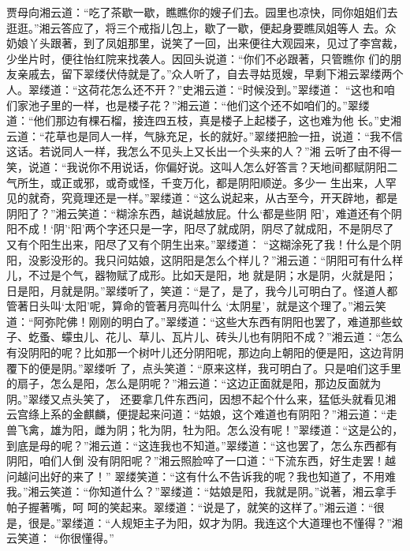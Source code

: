 \begin{parag}
    贾母向湘云道：“吃了茶歇一歇，瞧瞧你的嫂子们去。园里也凉快，同你姐姐们去逛逛。”湘云答应了，将三个戒指儿包上，歇了一歇，便起身要瞧凤姐等人 去。众奶娘丫头跟著，到了凤姐那里，说笑了一回，出来便往大观园来，见过了李宫裁，少坐片时，便往怡红院来找袭人。因回头说道：“你们不必跟著，只管瞧你 们的朋友亲戚去，留下翠缕伏侍就是了。”众人听了，自去寻姑觅嫂，早剩下湘云翠缕两个人。翠缕道：“这荷花怎么还不开？”史湘云道：“时候没到。”翠缕道： “这也和咱们家池子里的一样，也是楼子花？”湘云道：“他们这个还不如咱们的。”翠缕道：“他们那边有棵石榴，接连四五枝，真是楼子上起楼子，这也难为他 长。”史湘云道：“花草也是同人一样，气脉充足，长的就好。”翠缕把脸一扭，说道：“我不信这话。若说同人一样，我怎么不见头上又长出一个头来的人？”湘 云听了由不得一笑，说道：“我说你不用说话，你偏好说。这叫人怎么好答言？天地间都赋阴阳二气所生，或正或邪，或奇或怪，千变万化，都是阴阳顺逆。多少一 生出来，人罕见的就奇，究竟理还是一样。”翠缕道：“这么说起来，从古至今，开天辟地，都是阴阳了？”湘云笑道：“糊涂东西，越说越放屁。什么‘都是些阴 阳’，难道还有个阴阳不成！‘阴’‘阳’两个字还只是一字，阳尽了就成阴，阴尽了就成阳，不是阴尽了又有个阳生出来，阳尽了又有个阴生出来。”翠缕道： “这糊涂死了我！什么是个阴阳，没影没形的。我只问姑娘，这阴阳是怎么个样儿？”湘云道：“阴阳可有什么样儿，不过是个气，器物赋了成形。比如天是阳，地 就是阴；水是阴，火就是阳；日是阳，月就是阴。”翠缕听了，笑道：“是了，是了，我今儿可明白了。怪道人都管著日头叫‘太阳’呢，算命的管著月亮叫什么 ‘太阴星’，就是这个理了。”湘云笑道：“阿弥陀佛！刚刚的明白了。”翠缕道：“这些大东西有阴阳也罢了，难道那些蚊子、虼蚤、蠓虫儿、花儿、草儿、瓦片儿、砖头儿也有阴阳不成？”湘云道：“怎么有没阴阳的呢？比如那一个树叶儿还分阴阳呢，那边向上朝阳的便是阳，这边背阴覆下的便是阴。”翠缕听 了，点头笑道：“原来这样，我可明白了。只是咱们这手里的扇子，怎么是阳，怎么是阴呢？”湘云道：“这边正面就是阳，那边反面就为阴。”翠缕又点头笑了， 还要拿几件东西问，因想不起个什么来，猛低头就看见湘云宫绦上系的金麒麟，便提起来问道：“姑娘，这个难道也有阴阳？”湘云道：“走兽飞禽，雄为阳，雌为阴；牝为阴，牡为阳。怎么没有呢！”翠缕道：“这是公的，到底是母的呢？”湘云道：“这连我也不知道。”翠缕道：“这也罢了，怎么东西都有阴阳，咱们人倒 没有阴阳呢？”湘云照脸啐了一口道：“下流东西，好生走罢！越问越问出好的来了！” 翠缕笑道：“这有什么不告诉我的呢？我也知道了，不用难我。”湘云笑道：“你知道什么？”翠缕道：“姑娘是阳，我就是阴。”说著，湘云拿手帕子握著嘴，呵 呵的笑起来。翠缕道：“说是了，就笑的这样了。”湘云道：“很是，很是。”翠缕道：“人规矩主子为阳，奴才为阴。我连这个大道理也不懂得？”湘云笑道： “你很懂得。”
\end{parag}


